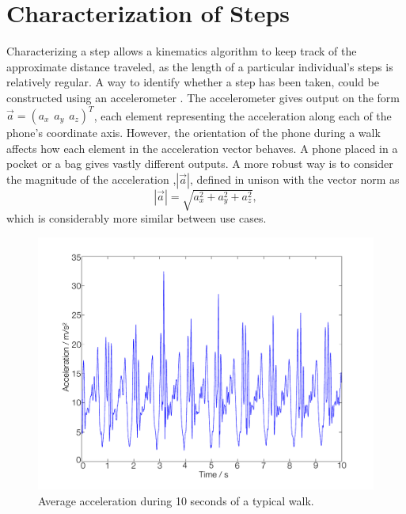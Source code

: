 \documentclass{LTHthesis}
\begin{document}
\section{Characterization of Steps}
\label{sec:step}
%
Characterizing a step allows a kinematics algorithm to keep track of the approximate distance traveled, as the length of a particular individual's steps is relatively regular. A way to identify whether a step has been taken, could be constructed using an accelerometer \cite{step_count}. The accelerometer gives output on the form $\vec a = (a_x \hspace{5pt} a_y \hspace{5pt} a_z)^T$, each element representing the acceleration along each of the phone's coordinate axis. However, the orientation of the phone during a walk affects how each element in the acceleration vector behaves. A phone placed in a pocket or a bag gives vastly different outputs. A more robust way is to consider the magnitude of the acceleration ,$|\vec a|$, defined in unison with the vector norm as 
%
\begin{equation}
|\vec a| = \sqrt{a_x^2+a_y^2+a_z^2},
\end{equation}
%
which is considerably more similar between use cases.
%
\begin{figure}[!hbt]

\includegraphics[width=1\textwidth ]{images/kinematic/avr_acc}
\caption{Average acceleration during 10 seconds of a typical walk.}\label{avr_acc}
\end{figure}
\end{document}
